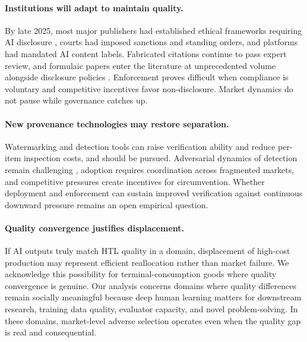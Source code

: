 \documentclass{article}
\theoremstyle{plain}
\theoremstyle{definition}
\theoremstyle{remark}
\begin{document}
\paragraph{Institutions will adapt to maintain quality.}
By late 2025, most major publishers had established ethical frameworks requiring AI disclosure \citep{gewaltig-2025-ai, zhu-2025-generative}, courts had imposed sanctions and standing orders, and platforms had mandated AI content labels. Fabricated citations continue to pass expert review, and formulaic papers enter the literature at unprecedented volume alongside disclosure policies \citep{suchak-etal-2025-explosion, esau-etal-2025-gptzero}. Enforcement proves difficult when compliance is voluntary and competitive incentives favor non-disclosure. Market dynamics do not pause while governance catches up.

\paragraph{New provenance technologies may restore separation.}
Watermarking and detection tools \citep{pmlr-v202-kirchenbauer23a, zhao2024provable, NEURIPS2023_b54d1757} can raise verification ability and reduce per-item inspection costs, and should be pursued. Adversarial dynamics of detection remain challenging \citep{sadasivan2025aigeneratedtextreliablydetected}, adoption requires coordination across fragmented markets, and competitive pressures create incentives for circumvention. Whether deployment and enforcement can sustain improved verification against continuous downward pressure remains an open empirical question.

\paragraph{Quality convergence justifies displacement.}
If AI outputs truly match HTL quality in a domain, displacement of high-cost production may represent efficient reallocation rather than market failure. We acknowledge this possibility for terminal-consumption goods where quality convergence is genuine. Our analysis concerns domains where quality differences remain socially meaningful because deep human learning matters for downstream research, training data quality, evaluator capacity, and novel problem-solving. In these domains, market-level adverse selection operates even when the quality gap is real and consequential.
\end{document}
